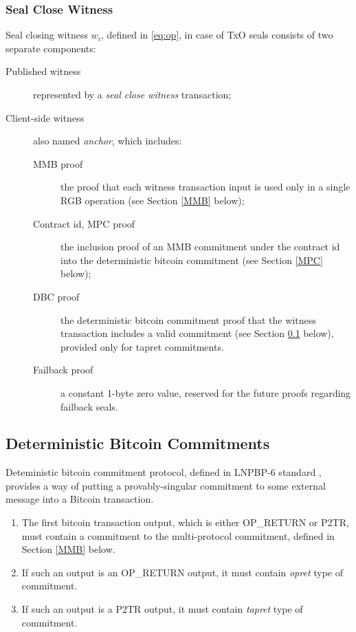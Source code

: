 \documentclass[9pt,oneside]{amsart}
\begin{document}
\begin{multicols}{2}
\subsubsection{Seal Close Witness}\label{Witness}

Seal closing witness $w_i$, defined in \ref{eq:op}, in case of TxO seals consists of two
separate components:
\begin{description}
\item[Published witness] represented by a \emph{seal close witness} transaction;
\item[Client-side witness] also named \emph{anchor},
    which includes:
    \begin{description}
    \item[MMB proof] the proof that each witness transaction input
        is used only in a single RGB operation (see Section \ref{MMB} below);
    \item[Contract id, MPC proof] the inclusion proof of an MMB commitment under the contract id
        into the deterministic bitcoin commitment (see Section \ref{MPC} below);
    \item[DBC proof] the deterministic bitcoin commitment proof that the witness transaction
        includes a valid commitment (see Section \ref{DBC} below), provided only
        for tapret commitments.
    \item[Failback proof] a constant 1-byte zero value,
        reserved for the future proofs regarding failback seals.
    \end{description}
\end{description}


\subsection{Deterministic Bitcoin Commitments}\label{DBC}

Deteministic bitcoin commitment protocol, defined in LNPBP-6 standard \cite{LNPBP6},
provides a way of putting a provably-singular commitment to some external message
into a Bitcoin transaction.

\begin{enumerate}
\item The first bitcoin transaction output, which is either OP\_RETURN or P2TR,
    must contain a commitment to the multi-protocol commitment, defined in Section \ref{MMB} below.
\item If such an output is an OP\_RETURN output, it must contain \emph{opret} type of commitment.
\item If such an output is a P2TR output, it must contain \emph{tapret} type of commitment.
\end{enumerate}


\end{multicols}
\end{document}
